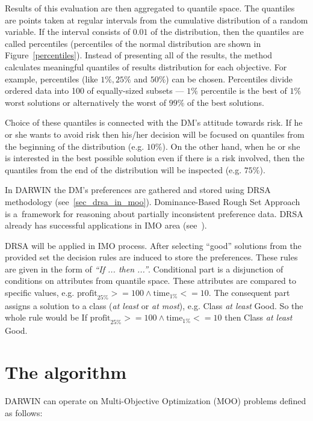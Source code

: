  Results of this evaluation are then aggregated to quantile space. The
 quantiles are points taken at regular intervals from the cumulative
 distribution of a random variable. If the interval consists of $0.01$ of the
 distribution, then the quantiles are called percentiles (percentiles of the
 normal distribution are shown in Figure~\ref{percentiles}). Instead of
 presenting all of the results, the method calculates meaningful quantiles of
 results distribution for each objective. For example, percentiles (like $1\%,
 25\%$ and $50\%$) can be chosen. Percentiles divide ordered data into 100 of
 equally-sized subsets --- $1\%$ percentile is the best of $1\%$ worst
 solutions or alternatively the worst of $99\%$ of the best solutions.

Choice of these quantiles is connected with the DM's attitude towards risk. If
he or she wants to avoid risk then his/her decision will be focused on
quantiles from the beginning of the distribution (e.g. $10\%$). On the other
hand, when he or she is interested in the best possible solution even if there
is a risk involved, then the quantiles from the end of the distribution will
be inspected (e.g. $75\%$).

In DARWIN the DM's preferences are gathered and stored using DRSA methodology
(see~\ref{sec_drsa_in_moo}). Dominance-Based Rough Set Approach is a~framework
for reasoning about partially inconsistent preference data. DRSA already has
successful applications in IMO area (see~\cite{GMS01, GMS02, GMS05}).

DRSA will be applied in IMO process. After selecting ``good'' solutions from
the provided set the decision rules are induced to store the
preferences. These rules are given in the form of \textit{``If ... then
  ...''}. Conditional part is a disjunction of conditions on attributes from
quantile space. These attributes are compared to specific values, e.g.
$\text{profit}_{25\%} >= 100 \land \text{time}_{1\%} <= 10$. The consequent
part assigns a solution to a class (\textit{at least} or \textit{at most}),
e.g. Class \textit{at least} Good. So the whole rule would be If
$\text{profit}_{25\%} >= 100 \land \text{time}_{1\%} <= 10$ then Class
\textit{at least} Good.

\section{The algorithm}
\label{idea-algo}


DARWIN can operate on Multi-Objective Optimization (MOO) problems defined as
follows:

